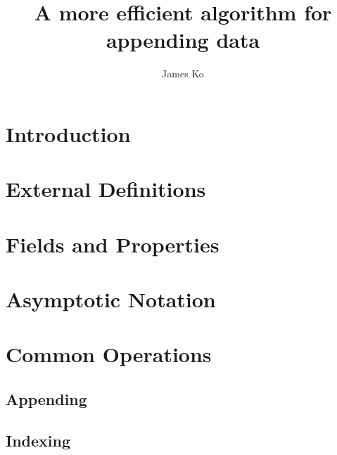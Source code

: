 \documentclass{article}
\title{A more efficient algorithm for appending data}
\author{James Ko}
\begin{document}
	\begin{titlepage}
		\maketitle
	\end{titlepage}
	
	\begin{abstract}
		
	\end{abstract}

	\newpage

	\section{Introduction}

	
	
	\section{External Definitions}
	
	
	
	\section{Fields and Properties}
	
	
	
	\section{Asymptotic Notation}
	
	
	
	\section{Common Operations}
	
	
	
	\subsection{Appending}
	
	
	
	
	
	
	
	
	
	\subsection{Indexing}
	
\end{document}
